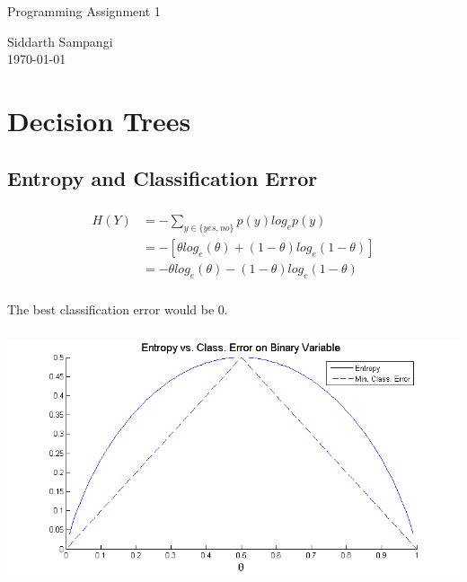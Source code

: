 \documentclass[paper=letterpaper,fontsize=11pt]{article}
\newcommand{\thetitle}{Programming Assignment 1}
\newcommand{\theauthor}{Siddarth Sampangi}
\numberwithin{equation}{section}
\numberwithin{table}{section} %
\numberwithin{figure}{section}
\begin{document}

\parbox{\linewidth}{ %
\parbox{.08\linewidth}{}\hfill %
\parbox{.73\linewidth}{\fontsize{24}{20}\selectfont\thetitle}\hfill %
\parbox{.19\linewidth}{\raggedleft\fontsize{12}{14}\theauthor\\\today} %
}
\horrule[2pt][-3.5pt][-6pt] %
\normalsize %
\section{Decision Trees}
\subsection{Entropy and Classification Error}
\subsubsection{}
\begin{align*}
H(Y) &= -\sum^{}_{y \in \{yes,no\}}p(y)log_{e}p(y)\\
&= -[\theta log_{e}(\theta)+(1-\theta)log_{e}(1-\theta)]\\
&= -\theta log_{e}(\theta)-(1-\theta)log_{e}(1-\theta)
\end{align*}
\subsubsection{}
The best classification error would be 0.
\subsubsection{}
\begin{center}
	\includegraphics[scale=0.8]{assets/p1a3.png}
\end{center}
\end{document}
